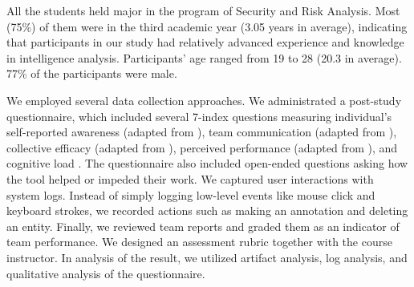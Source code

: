 All the students held major in the program of Security and Risk
Analysis. Most (75\%) of them were in the third academic year (3.05
years in average), indicating that participants in our study had
relatively advanced experience and knowledge in intelligence analysis.
Participants' age ranged from 19 to 28 (20.3 in average). 77\% of the
participants were male.

We employed several data collection approaches. We administrated a
post-study questionnaire, which included several 7-index questions
measuring individual's self-reported awareness (adapted from
\autocite{Convertino2011}), team communication (adapted from
\autocite{Convertino2011}), collective efficacy (adapted from
\autocite{Convertino2011}), perceived performance (adapted from
\autocite{Goyal2014}), and cognitive load \autocite{Hart1988}. The
questionnaire also included open-ended questions asking how the tool
helped or impeded their work. We captured user interactions with system
logs. Instead of simply logging low-level events like mouse click and
keyboard strokes, we recorded actions such as making an annotation and
deleting an entity. Finally, we reviewed team reports and graded them as
an indicator of team performance. We designed an assessment rubric
together with the course instructor. In analysis of the result, we
utilized artifact analysis, log analysis, and qualitative analysis of
the questionnaire.
